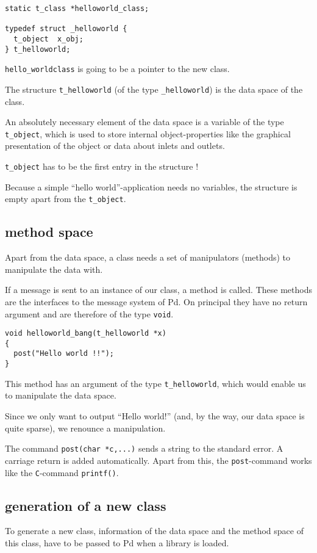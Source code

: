 \documentclass[12pt, a4paper,english,titlepage]{article}
\begin{document}
\begin{verbatim}
static t_class *helloworld_class;

typedef struct _helloworld {
  t_object  x_obj;
} t_helloworld;
\end{verbatim}

\verb+hello_worldclass+ is going to be a pointer to the new class.

The structure \verb+t_helloworld+ (of the type \verb+_helloworld+) is
the data space of the class.

An absolutely necessary element of the data space is a variable of the type
\verb+t_object+, which is used to store internal object-properties like
the graphical presentation of the object or data about inlets and outlets.

\verb+t_object+ has to be the first entry in the structure !

Because a simple ``hello world''-application needs no variables,
the structure is empty apart from the \verb+t_object+.


\subsection{method space}
Apart from the data space, a class needs a set of manipulators (methods) to
manipulate the data with.

If a message is sent to an instance of our class, a method is called.
These methods are the interfaces to the message system of Pd.
On principal they have no return argument and are therefore of the
type \verb+void+.

\begin{verbatim}
void helloworld_bang(t_helloworld *x)
{
  post("Hello world !!");
}
\end{verbatim}


This method has an argument of the type \verb+t_helloworld+,
which would enable us to manipulate the data space.

Since we only want to output ``Hello world!''
(and, by the way, our data space is quite sparse),
we renounce a manipulation.

The command \verb+post(char *c,...)+ sends a string to the standard error.
A carriage return is added automatically.
Apart from this, the \verb+post+-command works like the {\tt C}-command \verb+printf()+.

\subsection{generation of a new class}
To generate a new class, information of the data space and the method space of this class,
have to be passed to Pd when a library is loaded.
\end{document}
